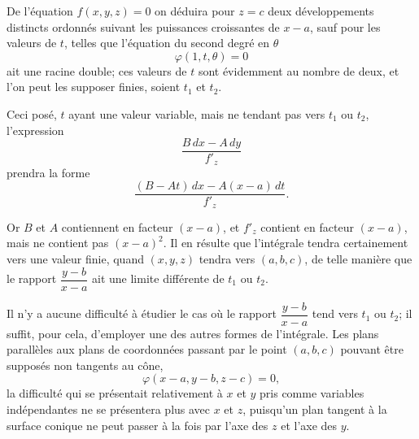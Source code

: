 \documentclass{article}
\begin{document}

De l'équation $f(x, y, z) = 0$ on déduira pour $z = c$ deux développements distincts ordonnés suivant les puissances croissantes de $x - a$, sauf pour les valeurs de $t$, telles que l'équation du second degré en $\theta$
\[
\varphi(1, t, \theta) = 0
\]
ait une racine double; ces valeurs de $t$ sont évidemment au nombre de deux, et l'on peut les supposer finies, soient $t_{1}$ et $t_{2}$.

Ceci posé, $t$ ayant une valeur variable, mais ne tendant pas vers $t_{1}$ ou $t_{2}$, l'expression
\[
\frac{B\,dx - A\,dy}{f'_{z}}
\]
prendra la forme
\[
\frac{(B - At)\,dx - A(x - a)\,dt}{f'_{z}}.
\]

Or $B$ et $A$ contiennent en facteur $(x - a)$, et $f'_{z}$ contient en facteur $(x - a)$, mais ne contient pas $(x - a)^{2}$. Il en résulte que l'intégrale tendra certainement vers une valeur finie, quand $(x, y, z)$ tendra vers $(a, b, c)$, de telle manière que le rapport $\dfrac{y - b}{x - a}$ ait une limite différente de $t_{1}$ ou $t_{2}$.

Il n'y a aucune difficulté à étudier le cas où le rapport $\dfrac{y - b}{x - a}$ tend vers $t_{1}$ ou $t_{2}$; il suffit, pour cela, d'employer une des autres formes de l'intégrale. Les plans parallèles aux plans de coordonnées passant par le point $(a, b, c)$ pouvant être supposés non tangents au cône,
\[
\varphi(x - a, y - b, z - c) = 0,
\]
la difficulté qui se présentait relativement à $x$ et $y$ pris comme variables indépendantes ne se présentera plus avec $x$ et $z$, puisqu'un plan tangent à la surface conique ne peut passer à la fois par l'axe des $z$ et l'axe des $y$.
\end{document}
